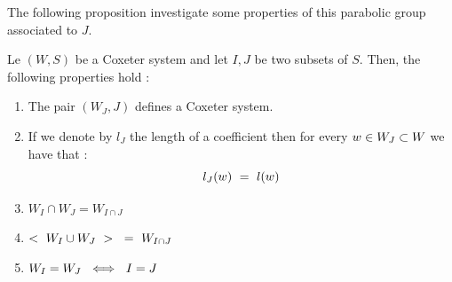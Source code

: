 The following proposition investigate some properties of this parabolic group associated to $J$.
\begin{proposition}
	Le $(W,S)$ be a Coxeter system and let $I,J$ be two subsets of $S$. Then, the following properties hold :
	\begin{enumerate}
		\item The pair $(W_J,J)$ defines a Coxeter system.
		\item If we denote by $l_J$ the length of a coefficient then for every $w\in W_J\subset W$ we have that :
		\begin{equation}
		l_J(w)\text{ }=\text{ } l(w)
		\end{equation}
		\item\begin{center}
			$W_I\cap W_J=W_{I\cap J}$
		\end{center}
		\item \begin{center}
			$<\text{ } W_I\cup W_J\text{ } >\text{ }=\text{ } W_{I\cap J}$
		\end{center}
		\item\begin{center}
			 $W_I=W_J\text{ } \iff \text{ } I=J$
		\end{center}
	\end{enumerate}
\end{proposition}
